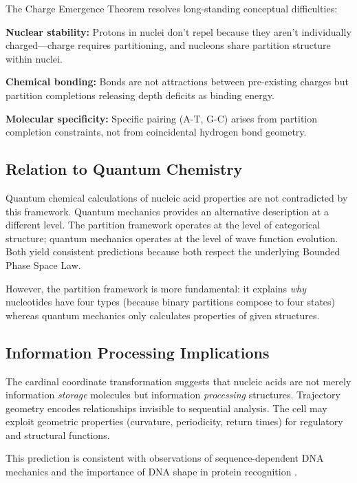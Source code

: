 \documentclass[twocolumn,10pt,a4paper]{article}
\theoremstyle{definition}
\theoremstyle{remark}
\begin{document}
The Charge Emergence Theorem resolves long-standing conceptual difficulties:

\textbf{Nuclear stability:} Protons in nuclei don't repel because they aren't individually charged---charge requires partitioning, and nucleons share partition structure within nuclei.

\textbf{Chemical bonding:} Bonds are not attractions between pre-existing charges but partition completions releasing depth deficits as binding energy.

\textbf{Molecular specificity:} Specific pairing (A-T, G-C) arises from partition completion constraints, not from coincidental hydrogen bond geometry.

\subsection{Relation to Quantum Chemistry}

Quantum chemical calculations of nucleic acid properties \cite{sponer2006} are not contradicted by this framework. Quantum mechanics provides an alternative description at a different level. The partition framework operates at the level of categorical structure; quantum mechanics operates at the level of wave function evolution. Both yield consistent predictions because both respect the underlying Bounded Phase Space Law.

However, the partition framework is more fundamental: it explains \emph{why} nucleotides have four types (because binary partitions compose to four states) whereas quantum mechanics only calculates properties of given structures.

\subsection{Information Processing Implications}

The cardinal coordinate transformation suggests that nucleic acids are not merely information \emph{storage} molecules but information \emph{processing} structures. Trajectory geometry encodes relationships invisible to sequential analysis. The cell may exploit geometric properties (curvature, periodicity, return times) for regulatory and structural functions.

This prediction is consistent with observations of sequence-dependent DNA mechanics \cite{rohs2009} and the importance of DNA shape in protein recognition \cite{parker2009}.

\end{document}
